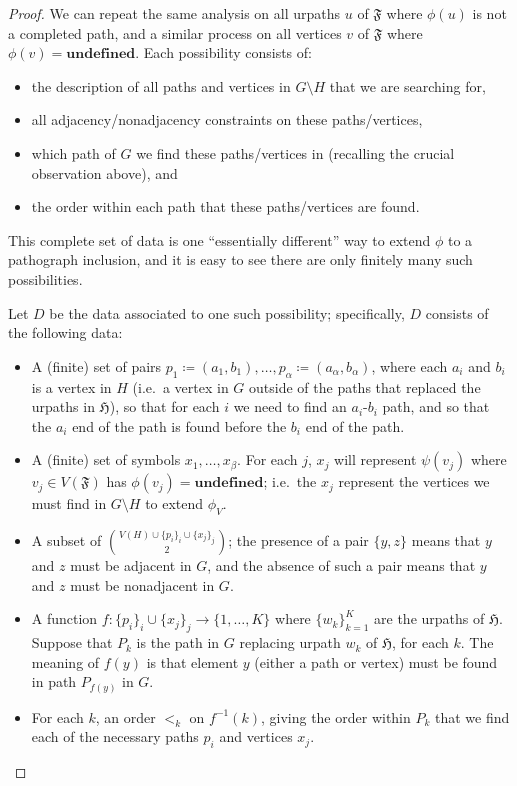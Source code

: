 \documentclass{article}
\newcommand{\Ff}{\mathfrak{F}}
\newcommand{\Hf}{\mathfrak{H}}
\newcommand{\ud}{\mathbf{undefined}}
\begin{document}
\begin{proof}
We can repeat the same analysis on all urpaths $u$ of $\Ff$ where $\phi(u)$ is not a completed path, and a similar process on all vertices $v$ of $\Ff$ where $\phi(v)=\ud$. Each possibility consists of:
\begin{itemize}
    \item the description of all paths and vertices in $G\setminus H$ that we are searching for,
    \item all adjacency/nonadjacency constraints on these paths/vertices,
    \item which path of $G$ we find these paths/vertices in (recalling the crucial observation above), and
    \item the order within each path that these paths/vertices are found.
\end{itemize}
This complete set of data is one ``essentially different'' way to extend $\phi$ to a pathograph inclusion, and it is easy to see there are only finitely many such possibilities.

\vspace{1em}

Let $D$ be the data associated to one such possibility; specifically, $D$ consists of the following data:
\begin{itemize}
    \item A (finite) set of pairs $p_1\coloneqq(a_1,b_1),\dots,p_\alpha\coloneqq(a_\alpha,b_\alpha)$, where each $a_i$ and $b_i$ is a vertex in $H$ (i.e.\ a vertex in $G$ outside of the paths that replaced the urpaths in $\Hf$), so that for each $i$ we need to find an $a_i$-$b_i$ path, and so that the $a_i$ end of the path is found before the $b_i$ end of the path.
    \item A (finite) set of symbols $x_1,\dots,x_\beta$. For each $j$, $x_j$ will represent $\psi(v_j)$ where $v_j\in V(\Ff)$ has $\phi(v_j)=\ud$; i.e.\ the $x_j$ represent the vertices we must find in $G\setminus H$ to extend $\phi_V$.
    \item A subset of $\binom{V(H)\cup \{p_i\}_i\cup \{x_j\}_j}{2}$; the presence of a pair $\{y,z\}$ means that $y$ and $z$ must be adjacent in $G$, and the absence of such a pair means that $y$ and $z$ must be nonadjacent in $G$.
    \item A function $f:\{p_i\}_i\cup \{x_j\}_j\to \{1,\dots,K\}$ where $\{w_k\}_{k=1}^K$ are the urpaths of $\Hf$. Suppose that $P_k$ is the path in $G$ replacing urpath $w_k$ of $\Hf$, for each $k$. The meaning of $f(y)$ is that element $y$ (either a path or vertex) must be found in path $P_{f(y)}$ in $G$.
    \item For each $k$, an order $<_k$ on $f^{-1}(k)$, giving the order within $P_k$ that we find each of the necessary paths $p_i$ and vertices $x_j$.
\end{itemize}


\end{proof}
\end{document}
